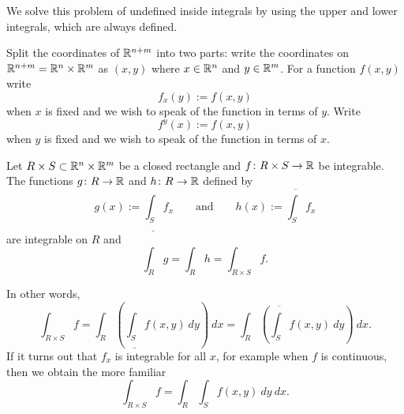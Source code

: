 We solve this problem of undefined inside integrals
by using the upper and lower integrals, which are always defined.

\medskip

Split the coordinates of ${\mathbb{R}}^{n+m}$ into two parts:
write the coordinates on ${\mathbb{R}}^{n+m} = {\mathbb{R}}^n \times {\mathbb{R}}^m$ as
$(x,y)$ where $x \in {\mathbb{R}}^n$ and $y \in {\mathbb{R}}^m$.  For a function $f(x,y)$
write
\begin{equation*}
f_x(y) := f(x,y)
\end{equation*}
when $x$ is fixed and we wish to speak of the function in terms of $y$.
Write
\begin{equation*}
f^y(x) := f(x,y)
\end{equation*}
when $y$ is fixed and we wish to speak of the function in terms of $x$.

\begin{thm} \label{mv:fubinivA} 
Let $R \times S \subset {\mathbb{R}}^n \times {\mathbb{R}}^m$ be a closed rectangle and
$f \colon R \times S \to {\mathbb{R}}$ be integrable.
The functions $g \colon R \to {\mathbb{R}}$ and $h \colon R \to {\mathbb{R}}$ defined by
\begin{equation*}
g(x) := \underline{\int_S} f_x \qquad
\text{and} \qquad
h(x) := \overline{\int_S} f_x 
\end{equation*}
are integrable on $R$ and
\begin{equation*}
\int_R g = \int_R h = \int_{R \times S} f .
\end{equation*}
\end{thm}

In other words,
\begin{equation*}
\int_{R \times S} f
=
 \int_R \left(
 \underline{\int_S} f(x,y) ~ dy
\right) ~ dx
=
 \int_R \left(
 \overline{\int_S} f(x,y) ~ dy
\right) ~ dx .
\end{equation*}
If it turns out that $f_x$ is integrable for all $x$, for example when
$f$ is continuous, then we obtain the more familiar
\begin{equation*}
\int_{R \times S} f
=
 \int_R \int_S f(x,y) ~ dy ~ dx .
\end{equation*}

